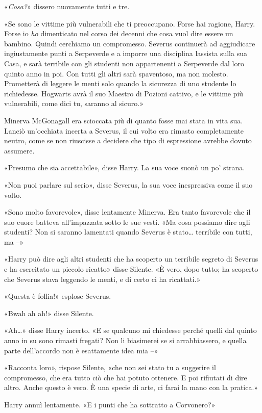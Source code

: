 «\textit{Cosa?}» dissero nuovamente tutti e tre.

«Se sono le vittime più vulnerabili che ti preoccupano. Forse hai ragione, Harry. Forse io \textit{ho} dimenticato nel corso dei decenni che cosa vuol dire essere un bambino. Quindi cerchiamo un compromesso. Severus continuerà ad aggiudicare ingiustamente punti a Serpeverde e a imporre una disciplina lassista sulla sua Casa, e sarà terribile con gli studenti non appartenenti a Serpeverde dal loro quinto anno in poi. Con tutti gli altri sarà spaventoso, ma non molesto. Prometterà di leggere le menti solo quando la sicurezza di uno studente lo richiedesse. Hogwarts avrà il suo Maestro di Pozioni cattivo, e le vittime più vulnerabili, come dici tu, saranno al sicuro.»

Minerva McGonagall era scioccata più di quanto fosse mai stata in vita sua. Lanciò un’occhiata incerta a Severus, il cui volto era rimasto completamente neutro, come se non riuscisse a decidere che tipo di espressione avrebbe dovuto assumere.

«Presumo che sia accettabile», disse Harry. La sua voce suonò un po’ strana.

«Non puoi parlare sul serio», disse Severus, la sua voce inespressiva come il suo volto.

«Sono molto favorevole», disse lentamente Minerva. Era tanto favorevole che il suo cuore batteva all’impazzata sotto le sue vesti. «Ma cosa possiamo dire agli studenti? Non si saranno lamentati quando Severus è stato… terribile con tutti, ma –»

«Harry può dire agli altri studenti che ha scoperto un terribile segreto di Severus e ha esercitato un piccolo ricatto» disse Silente. «È vero, dopo tutto; ha scoperto che Severus stava leggendo le menti, e di certo ci ha ricattati.»

«Questa è follia!» esplose Severus.

«Bwah ah ah!» disse Silente.

«Ah…» disse Harry incerto. «E se qualcuno mi chiedesse perché quelli dal quinto anno in su sono rimasti fregati? Non li biasimerei se si arrabbiassero, e quella parte dell’accordo non è esattamente idea mia –»

«Racconta loro», rispose Silente, «che non sei stato tu a suggerire il compromesso, che era tutto ciò che hai potuto ottenere. E poi rifiutati di dire altro. Anche questo è vero. È una specie di arte, ci farai la mano con la pratica.»

Harry annuì lentamente. «E i punti che ha sottratto a Corvonero?»

